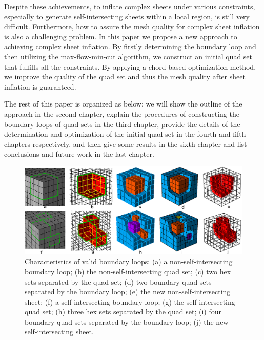 \documentclass[final,5p,times,twocolumn]{elsarticle}
\begin{document}
Despite these achievements, to inflate complex sheets under various constraints, especially to generate self-intersecting sheets within a local region, is still very difficult. Furthermore, how to assure the mesh quality for complex sheet inflation is also a challenging problem. In this paper we propose a new approach to achieving complex sheet inflation. By firstly determining the boundary loop and then utilizing the max-flow-min-cut algorithm, we construct an initial quad set that fulfills all the constraints. By applying a chord-based optimization method, we improve the quality of the quad set and thus the mesh quality after sheet inflation is guaranteed. 

The rest of this paper is organized as below: we will show the outline of the approach in the second chapter, explain the procedures of constructing the boundary loops of quad sets in the third chapter, provide the details of the determination and optimization of the initial quad set in the fourth and fifth chapters respectively, and then give some results in the sixth chapter and list conclusions and future work in the last chapter.

\begin{figure}[htbp]
\begin{center}
\includegraphics[width=15cm]{figures/compo_loop_prop.png}
\caption{Characteristics of valid boundary loops: (a) a non-self-intersecting boundary loop; (b) the non-self-intersecting quad set; (c) two hex sets separated by the quad set; (d) two boundary quad sets separated by the boundary loop; (e) the new non-self-intersecting sheet; (f) a self-intersecting boundary loop; (g) the self-intersecting quad set; (h) three hex sets separated by the quad set; (i) four boundary quad sets separated by the boundary loop; (j) the new self-intersecting sheet.}
\label{fig:loop_prop}
\end{center}
\end{figure}

\end{document}
